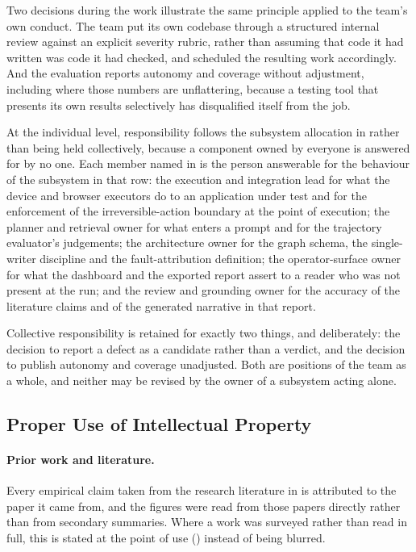 Two decisions during the work illustrate the same principle applied to the
team's own conduct. The team put its own codebase through a structured internal
review against an explicit severity rubric, rather than assuming that code it
had written was code it had checked, and scheduled the resulting work
accordingly. And the evaluation reports autonomy and coverage without
adjustment, including where those numbers are unflattering, because a testing
tool that presents its own results selectively has disqualified itself from the
job.

At the individual level, responsibility follows the subsystem allocation in
 rather than being held collectively, because a
component owned by everyone is answered for by no one. Each member named in
 is the person answerable for the behaviour of the subsystem
in that row: the execution and integration lead for what the device and browser
executors do to an application under test and for the enforcement of the
irreversible-action boundary at the point of execution; the planner and
retrieval owner for what enters a prompt and for the trajectory evaluator's
judgements; the architecture owner for the graph schema, the single-writer
discipline and the fault-attribution definition; the operator-surface owner for
what the dashboard and the exported report assert to a reader who was not
present at the run; and the review and grounding owner for the accuracy of the
literature claims and of the generated narrative in that report.

Collective responsibility is retained for exactly two things, and deliberately:
the decision to report a defect as a candidate rather than a verdict, and the
decision to publish autonomy and coverage unadjusted. Both are positions of the
team as a whole, and neither may be revised by the owner of a subsystem acting
alone.

\subsection{Proper Use of Intellectual Property}
\label{sec:ip}

\paragraph{Prior work and literature.} Every empirical claim taken from the
research literature in  is attributed to the paper it came
from, and the figures were read from those papers directly rather than from
secondary summaries. Where a work was surveyed rather than read in full, this
is stated at the point of use () instead of being
blurred.

